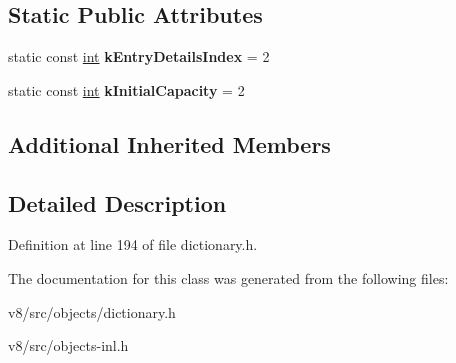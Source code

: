 \subsection*{Static Public Attributes}
\begin{DoxyCompactItemize}
\item 
\mbox{\label{classv8_1_1internal_1_1NameDictionary_a09c0d1b230f81298c102569e71571684}} 
static const \mbox{\hyperlink{classint}{int}} {\bfseries k\+Entry\+Details\+Index} = 2
\item 
\mbox{\label{classv8_1_1internal_1_1NameDictionary_abea976ce6047250a4aee9794f221fb18}} 
static const \mbox{\hyperlink{classint}{int}} {\bfseries k\+Initial\+Capacity} = 2
\end{DoxyCompactItemize}
\subsection*{Additional Inherited Members}


\subsection{Detailed Description}


Definition at line 194 of file dictionary.\+h.



The documentation for this class was generated from the following files\+:\begin{DoxyCompactItemize}
\item 
v8/src/objects/dictionary.\+h\item 
v8/src/objects-\/inl.\+h\end{DoxyCompactItemize}
